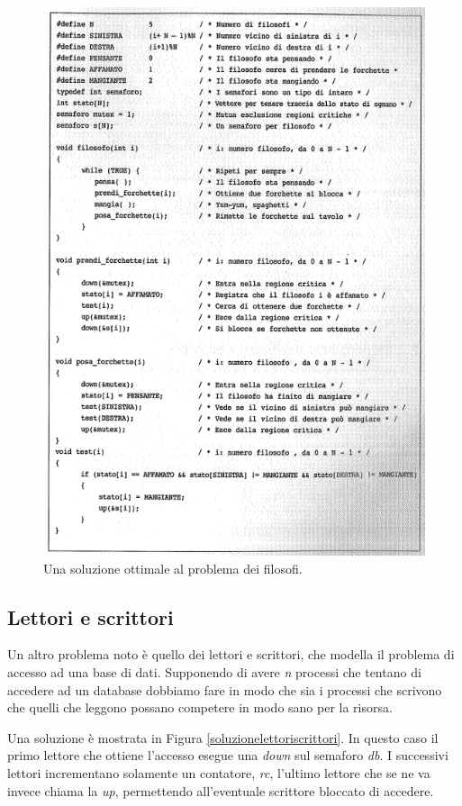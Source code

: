 \begin{figure}[H]
    \centering
    \includegraphics[width=1\linewidth]{assets/soluzionefilosofi6.png}
    \caption{Una soluzione ottimale al problema dei filosofi.}
    \label{soluzionefilosofi}
\end{figure}


\subsection{Lettori e scrittori}
Un altro problema noto è quello dei lettori e scrittori, che modella il problema di accesso ad una base di dati. Supponendo di avere \textit{n} processi che tentano di accedere ad un database dobbiamo fare in modo che sia i processi che scrivono che quelli che leggono possano competere in modo sano per la risorsa.

Una soluzione è mostrata in Figura \ref{soluzionelettoriscrittori}. In questo caso il primo lettore che ottiene l'accesso esegue una \textit{down} sul semaforo \textit{db}. I successivi lettori incrementano solamente un contatore, \textit{rc}, l'ultimo lettore che se ne va invece chiama la \textit{up}, permettendo all'eventuale scrittore bloccato di accedere. 

